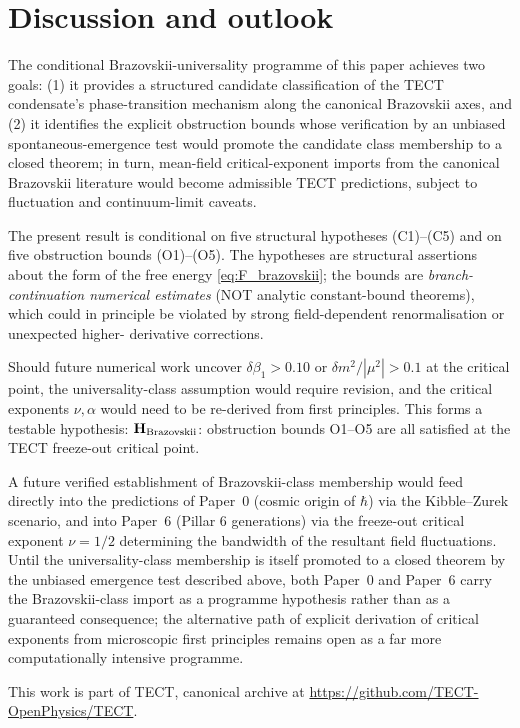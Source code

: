 \section{Discussion and outlook}\label{sec:discussion}

The conditional Brazovskii-universality programme of this paper
achieves two goals: (1) it provides a structured candidate
classification of the TECT condensate's phase-transition mechanism
along the canonical Brazovskii axes, and (2) it identifies the
explicit obstruction bounds whose verification by an unbiased
spontaneous-emergence test would promote the candidate class
membership to a closed theorem; in turn, mean-field critical-exponent
imports from the canonical Brazovskii literature would become
admissible TECT predictions, subject to fluctuation and
continuum-limit caveats.

The present result is conditional on five structural hypotheses
(C1)--(C5) and on five obstruction bounds (O1)--(O5). The
hypotheses are structural assertions about the form of the free
energy \eqref{eq:F_brazovskii}; the bounds are
\emph{branch-continuation numerical estimates} (NOT analytic
constant-bound theorems), which could in principle be violated by
strong field-dependent renormalisation or unexpected higher-
derivative corrections.

Should future numerical work uncover $\delta\beta_1 > 0.10$ or
$\delta m^2 / |\mu^2| > 0.1$ at the critical point, the universality-class
assumption would require revision, and the critical exponents $\nu, \alpha$
would need to be re-derived from first principles. This forms a testable
hypothesis: $\mathbf{H}_{\rm Brazovskii}$: obstruction bounds O1--O5 are
all satisfied at the TECT freeze-out critical point.

A future verified establishment of Brazovskii-class membership would
feed directly into the predictions of Paper~0 (cosmic origin of
$\hbar$) via the Kibble--Zurek scenario, and into Paper~6 (Pillar 6
generations) via the freeze-out critical exponent $\nu = 1/2$
determining the bandwidth of the resultant field fluctuations. Until
the universality-class membership is itself promoted to a closed
theorem by the unbiased emergence test described above, both Paper~0
and Paper~6 carry the Brazovskii-class import as a programme
hypothesis rather than as a guaranteed consequence; the alternative
path of explicit derivation of critical exponents from microscopic
first principles remains open as a far more computationally
intensive programme.

\begin{acknowledgments}
This work is part of TECT, canonical archive at
\url{https://github.com/TECT-OpenPhysics/TECT}.
\end{acknowledgments}





